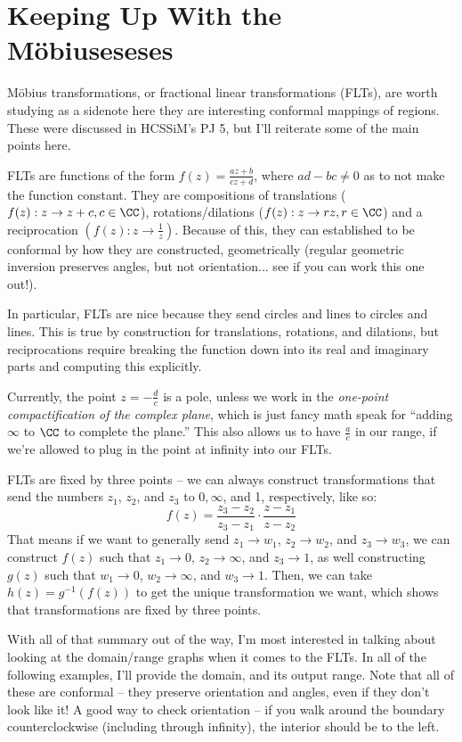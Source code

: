 \section{Keeping Up With the M\"{o}biuseseses}
M\"{o}bius transformations, or fractional linear transformations (FLTs), are worth studying as a sidenote here they are interesting conformal mappings of regions. These were discussed in HCSSiM's PJ 5, but I'll reiterate some of the main points here.

FLTs are functions of the form $f(z) = \frac{az+b}{cz+d}$, where $ad - bc \neq 0$ as to not make the function constant. They are compositions of translations ($f(z) : z \rightarrow z + c, c \in \CC$), rotations/dilations ($f(z) : z \rightarrow rz, r \in \CC$) and a reciprocation $\left(f(z) : z \rightarrow \frac{1}{z}\right)$. Because of this, they can established to be conformal by how they are constructed, geometrically (regular geometric inversion preserves angles, but not orientation... see if you can work this one out!).

In particular, FLTs are nice because they send circles and lines to circles and lines. This is true by construction for translations, rotations, and dilations, but reciprocations require breaking the function down into its real and imaginary parts and computing this explicitly.

Currently, the point $z = - \frac{d}{c}$ is a pole, unless we work in the \textit{one-point compactification of the complex plane}, which is just fancy math speak for ``adding $\infty$ to $\CC$ to complete the plane.'' This also allows us to have $\frac{a}{c}$ in our range, if we're allowed to plug in the point at infinity into our FLTs.

FLTs are fixed by three points -- we can always construct transformations that send the numbers $z_1$, $z_2$, and $z_3$ to $0, \infty$, and 1, respectively, like so:
\[
  f(z) = \frac{z_3-z_2}{z_3-z_1} \cdot \frac{z-z_1}{z-z_2}
\]
That means if we want to generally send $z_1 \rightarrow w_1$, $z_2 \rightarrow w_2$, and $z_3 \rightarrow w_3$, we can construct $f(z)$ such that $z_1 \rightarrow 0$, $z_2 \rightarrow \infty$, and $z_3 \rightarrow 1$, as well constructing $g(z)$ such that $w_1 \rightarrow 0$, $w_2 \rightarrow \infty$, and $w_3 \rightarrow 1$. Then, we can take $h(z) = g^{-1}(f(z))$ to get the unique transformation we want, which shows that transformations are fixed by three points.

With all of that summary out of the way, I'm most interested in talking about looking at the domain/range graphs when it comes to the FLTs. In all of the following examples, I'll provide the domain, and its output range. Note that all of these are conformal -- they preserve orientation and angles, even if they don't look like it! A good way to check orientation -- if you walk around the boundary counterclockwise (including through infinity), the interior should be to the left.

